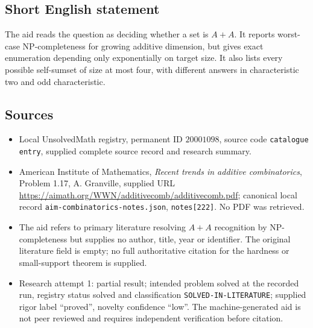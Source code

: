 \documentclass[11pt]{article}
\begin{document}
\subsection{Short English statement}
The aid reads the question as deciding whether a set is $A+A$. It reports worst-case NP-completeness for growing additive dimension, but gives exact enumeration depending only exponentially on target size. It also lists every possible self-sumset of size at most four, with different answers in characteristic two and odd characteristic.
\subsection{Sources}
\begin{itemize}
\item Local UnsolvedMath registry, permanent ID $20001098$, source code \texttt{catalogue entry}, supplied complete source record and research summary.
\item American Institute of Mathematics, \emph{Recent trends in additive combinatorics}, Problem 1.17, A. Granville, supplied URL \url{https://aimath.org/WWN/additivecomb/additivecomb.pdf}; canonical local record \texttt{aim-combinatorics-notes.json}, \texttt{notes[222]}. No PDF was retrieved.
\item The aid refers to primary literature resolving $A+A$ recognition by NP-completeness but supplies no author, title, year or identifier. The original literature field is empty; no full authoritative citation for the hardness or small-support theorem is supplied.
\item Research attempt 1: partial result; intended problem solved at the recorded run, registry status solved and classification \texttt{SOLVED-IN-LITERATURE}; supplied rigor label ``proved'', novelty confidence ``low''. The machine-generated aid is not peer reviewed and requires independent verification before citation.
\end{itemize}
\end{document}
